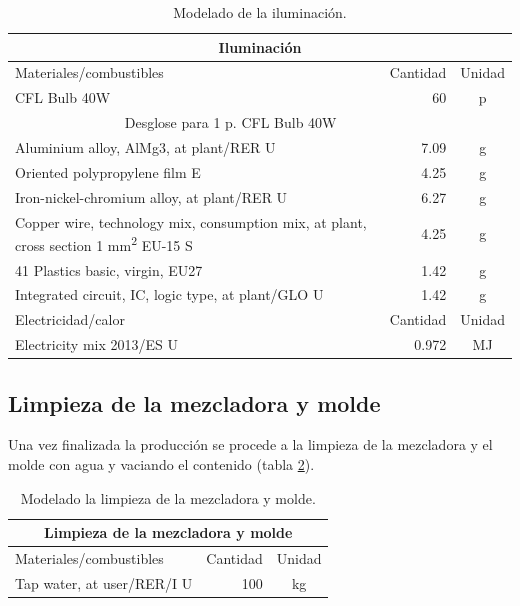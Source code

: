 \begin{table}[!htb]
\centering
\begin{tabular}{p{8cm}rc}
\toprule
\multicolumn{3}{c}{Iluminación}\\
\midrule
Materiales/combustibles & Cantidad & Unidad\\
\midrule
CFL Bulb 40W & 60 & p\\
\multicolumn{2}{c}{Desglose para 1 p. CFL Bulb 40W}\\
\cmidrule(r){1-2}
Aluminium alloy, AlMg3, at plant/RER U & 7.09 & \si{g}\\
Oriented polypropylene film E & 4.25 & \si{g}\\
Iron-nickel-chromium alloy, at plant/RER U & 6.27 & \si{g}\\
Copper wire, technology mix, consumption mix, at plant, cross section 1 \si{mm^2} EU-15 S & 4.25 & \si{g}\\
41 Plastics basic, virgin, EU27 & 1.42 & \si{g}\\
Integrated circuit, IC, logic type, at plant/GLO U & 1.42 & \si{g}\\
\midrule
Electricidad/calor & Cantidad & Unidad\\
\midrule
Electricity mix 2013/ES U & 0.972 & \si{MJ}\\
\bottomrule
\end{tabular}
\caption{Modelado de la iluminación.}
\label{modeladodeiluminacion}
\end{table}

\subsection{Limpieza de la mezcladora y molde}

Una vez finalizada la producción se procede a la limpieza de la mezcladora y el molde con agua y vaciando el contenido (tabla \ref{modeladolimpiezamezcladora}).

\begin{table}[!htb]
\centering
\begin{tabular}{p{8cm}rc}
\toprule
\multicolumn{3}{c}{Limpieza de la mezcladora y molde}\\
\midrule
Materiales/combustibles & Cantidad & Unidad\\
\midrule
Tap water, at user/RER/I U & 100 & \si{kg}\\
\bottomrule
\end{tabular}
\caption{Modelado la limpieza de la mezcladora y molde.}
\label{modeladolimpiezamezcladora}
\end{table}

